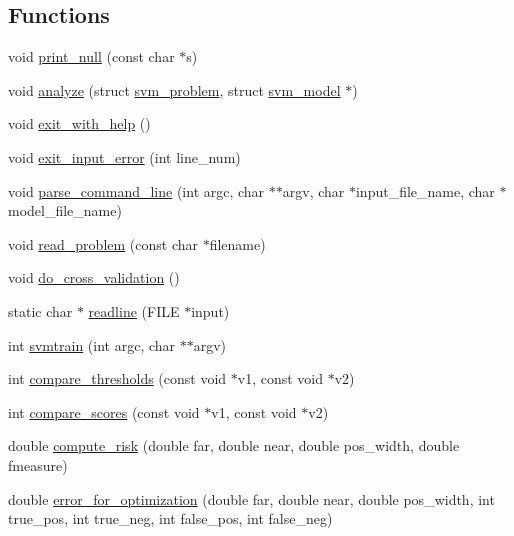 \subsection*{Functions}
\begin{DoxyCompactItemize}
\item 
void \hyperlink{svm-train_8cpp_a65c4fd49dffe24dd51ad9505c5c1ff4a}{print\-\_\-null} (const char $\ast$s)
\item 
void \hyperlink{svm-train_8cpp_a6f420eac4f979422d475754e1ee41a0f}{analyze} (struct \hyperlink{structsvm__problem}{svm\-\_\-problem}, struct \hyperlink{structsvm__model}{svm\-\_\-model} $\ast$)
\item 
void \hyperlink{svm-train_8cpp_a8bbbfc2cd5ea26b69d3b880c6f509e93}{exit\-\_\-with\-\_\-help} ()
\item 
void \hyperlink{svm-train_8cpp_ada0be431a4ed2ba4b1a09d4449f2c75b}{exit\-\_\-input\-\_\-error} (int line\-\_\-num)
\item 
void \hyperlink{svm-train_8cpp_a15f26fdd66eabc2d70d032433a9c8a50}{parse\-\_\-command\-\_\-line} (int argc, char $\ast$$\ast$argv, char $\ast$input\-\_\-file\-\_\-name, char $\ast$model\-\_\-file\-\_\-name)
\item 
void \hyperlink{svm-train_8cpp_a867369fb2d5148f5da088f4279a2ae8b}{read\-\_\-problem} (const char $\ast$filename)
\item 
void \hyperlink{svm-train_8cpp_a997126c915d77402d81a828226383928}{do\-\_\-cross\-\_\-validation} ()
\item 
static char $\ast$ \hyperlink{svm-train_8cpp_aa324656b7bb4eb3ee42699d33c21ef7a}{readline} (F\-I\-L\-E $\ast$input)
\item 
int \hyperlink{svm-train_8cpp_ae76c8c1fe85a0e20a93cf587b71f9ea9}{svmtrain} (int argc, char $\ast$$\ast$argv)
\item 
int \hyperlink{svm-train_8cpp_aa4983a5b9ebd114f13a80eb2f68f2bb7}{compare\-\_\-thresholds} (const void $\ast$v1, const void $\ast$v2)
\item 
int \hyperlink{svm-train_8cpp_ab7647dadbd83ef2020afa080091c43bd}{compare\-\_\-scores} (const void $\ast$v1, const void $\ast$v2)
\item 
double \hyperlink{svm-train_8cpp_af07f0fa4ba41934e435cb8f3b955ea8d}{compute\-\_\-risk} (double far, double near, double pos\-\_\-width, double fmeasure)
\item 
double \hyperlink{svm-train_8cpp_a9fccbe7b58f4809ef8085cac3d8ac32c}{error\-\_\-for\-\_\-optimization} (double far, double near, double pos\-\_\-width, int true\-\_\-pos, int true\-\_\-neg, int false\-\_\-pos, int false\-\_\-neg)
\end{DoxyCompactItemize}
